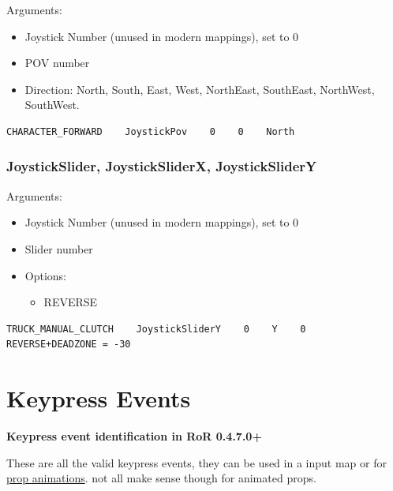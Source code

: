 Arguments:

\begin{itemize}
\tightlist
\item
  Joystick Number (unused in modern mappings), set to 0
\item
  POV number
\item
  Direction: North, South, East, West, NorthEast, SouthEast, NorthWest,
  SouthWest.
\end{itemize}

\begin{verbatim}
CHARACTER_FORWARD    JoystickPov    0    0    North
\end{verbatim}

\hypertarget{joystickslider-joysticksliderx-joystickslidery}{%
\subsubsection{JoystickSlider, JoystickSliderX,
JoystickSliderY}\label{joystickslider-joysticksliderx-joystickslidery}}

Arguments:

\begin{itemize}
\tightlist
\item
  Joystick Number (unused in modern mappings), set to 0
\item
  Slider number
\item
  Options:

  \begin{itemize}
  \tightlist
  \item
    REVERSE
  \end{itemize}
\end{itemize}

\begin{verbatim}
TRUCK_MANUAL_CLUTCH    JoystickSliderY    0    Y    0    REVERSE+DEADZONE = -30
\end{verbatim}

\hypertarget{keypress-events}{%
\section{Keypress Events}\label{keypress-events}}

\textbf{Keypress event identification in RoR 0.4.7.0+}

These are all the valid keypress events, they can be used in a input map
or for
\href{http://docs.rigsofrods.org/vehicle-creation/fileformat-truck/\#add_animation}{prop
animations}. not all make sense though for animated props.

